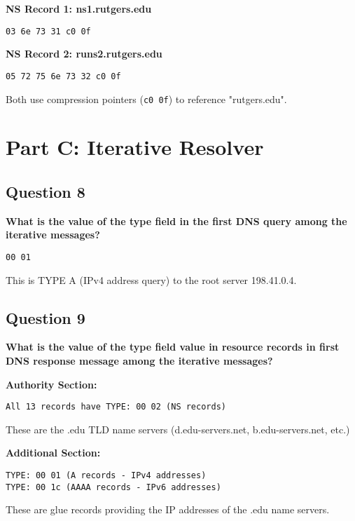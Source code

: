 \documentclass[11pt]{article}
\begin{document}
\textbf{NS Record 1: ns1.rutgers.edu}
\begin{lstlisting}
03 6e 73 31 c0 0f
\end{lstlisting}

\textbf{NS Record 2: runs2.rutgers.edu}
\begin{lstlisting}
05 72 75 6e 73 32 c0 0f
\end{lstlisting}

Both use compression pointers (\texttt{c0 0f}) to reference "rutgers.edu".

\newpage

\section*{Part C: Iterative Resolver}

\subsection*{Question 8}
\textbf{What is the value of the type field in the first DNS query among the iterative messages?}

\begin{lstlisting}
00 01
\end{lstlisting}

This is TYPE A (IPv4 address query) to the root server 198.41.0.4.

\vspace{0.5cm}

\subsection*{Question 9}
\textbf{What is the value of the type field value in resource records in first DNS response message among the iterative messages?}

\textbf{Authority Section:}
\begin{lstlisting}
All 13 records have TYPE: 00 02 (NS records)
\end{lstlisting}
These are the .edu TLD name servers (d.edu-servers.net, b.edu-servers.net, etc.)

\textbf{Additional Section:}
\begin{lstlisting}
TYPE: 00 01 (A records - IPv4 addresses)
TYPE: 00 1c (AAAA records - IPv6 addresses)
\end{lstlisting}
These are glue records providing the IP addresses of the .edu name servers.

\vspace{0.5cm}
\end{document}

